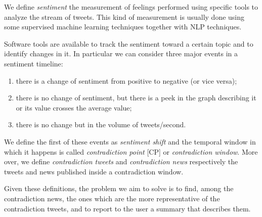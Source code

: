 We define \emph{sentiment} the measurement of feelings performed using specific tools to analyze the stream of tweets.
This kind of measurement is usually done using some supervised machine learning techniques together with NLP techniques.

Software tools are available to track the sentiment toward a certain topic and to identify changes in it. In particular we can consider three major events in a sentiment timeline:

\begin{enumerate}
	\item there is a change of sentiment from positive to negative (or
		vice versa);
	\item there is no change of sentiment, but there is a peek in the graph
		describing it or its value crosses the average value;
	\item there is no change but in the volume of tweets/second.
\end{enumerate}

We define the first of these events as \emph{sentiment shift} and the temporal window in which it happens is called \emph{contradiction point} [CP] or \emph{contradiction window}. 
More over, we define \emph{contradiction tweets} and \emph{contradiction news} respectively the tweets and news published inside a contradiction window.

Given these definitions, the problem we aim to solve is to find, among the contradiction news, the ones which are the more representative of the contradiction tweets, and to report to the user a summary that describes them.

